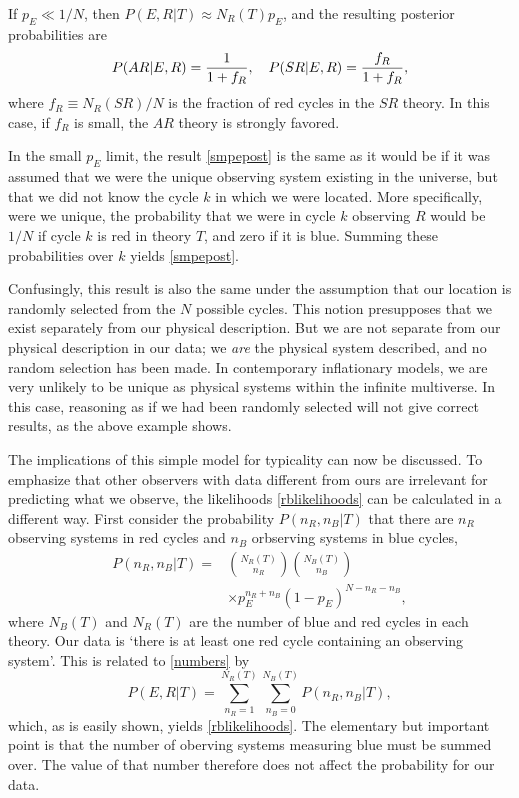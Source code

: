 \documentclass[pra,twocolumn,nofootinbib,eqsecnum,floatfix]{revtex4}
\begin{document}
If $p_E \ll 1/N$, then $P(E,R|T) \approx N_R(T) p_E$, and the resulting posterior probabilities are 
\begin{equation}
P(AR|E,R) = {1\over 1 + f_R},  \quad P(SR|E,R) = {f_R\over 1 + f_R},
\label{smpepost}
\end{equation}
where $f_R \equiv N_R(SR)/N$ is the fraction of red cycles in the $SR$ theory.  In this case,
if $f_R$ is small, the $AR$ theory is strongly favored.

In the small $p_E$ limit, the result \eqref{smpepost} is the same as it would be if it was assumed that we were the unique observing system existing in the universe, but that we did not know the cycle $k$ in which we were located.  More specifically,  were  we unique, the probability 
that we were in cycle $k$ observing $R$ would be $1/N$
if cycle $k$ is red in theory $T$, and zero if it is blue. Summing these probabilities 
over $k$ yields \eqref{smpepost}.

Confusingly, this result is also the same under the assumption that our location is randomly selected from the $N$ possible cycles.  This notion presupposes that we exist separately from our physical description.  But  we are not separate from our physical description in our data; 
we {\it are} the physical system described, and no random selection has been made.
In contemporary inflationary models, we are very unlikely to be unique as physical systems within the infinite multiverse.  In this case, reasoning as if we had been randomly selected will not give correct results, as the above example shows.  

The implications of this simple model for typicality can now be discussed.  To emphasize that other observers with data different from ours are irrelevant for predicting what we observe, the likelihoods \eqref{rblikelihoods} can be calculated in a different way.  First consider the probability $P(n_R,n_B|T)$  that there are $n_R$ observing systems in red cycles and $n_B$ orbserving systems in blue cycles,
\begin{align}
P(n_R,n_B|T) = &{N_R(T) \choose n_R}{N_B(T) \choose n_B} \nonumber \\
&\times p_E^{n_R+n_B} (1-p_{E})^{N-n_R-n_B},
\label{numbers}
\end{align}
where $N_B(T)$ and $N_R(T)$ are the number of blue and red cycles in each theory. 
Our data is `there is at least one red cycle containing an observing system'. This is related to \eqref{numbers} by 
\begin{equation}
P(E,R|T) = \sum\limits_{n_R=1}^{N_R(T)}\sum\limits_{n_B=0}^{N_B(T)}P(n_R,n_B|T),
\label{sumoverblue}
\end{equation}
which, as is easily shown, yields \eqref{rblikelihoods}. The elementary but important point is that the number of oberving systems measuring blue must be summed over. The value of that number therefore does not affect the probability for our data. 
\end{document}
